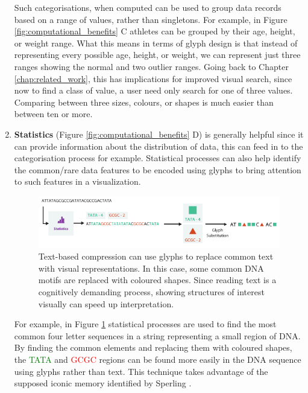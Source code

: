 \begin{enumerate}
Such categorisations, when computed can be used to group data records based on a range of values, rather than singletons.
For example, in Figure \ref{fig:computational_benefits} C athletes can be grouped by their age, height, or weight range.
What this means in terms of glyph design is that instead of representing every possible age, height, or weight, we can represent just three ranges showing the normal and two outlier ranges.
Going back to Chapter \ref{chap:related_work}, this has implications for improved visual search, since now to find a class of value, a user need only search for one of three values.
Comparing between three sizes, colours, or shapes is much easier than between ten or more.

\item \textbf{Statistics} (Figure \ref{fig:computational_benefits} D) is generally helpful since it can provide information about the distribution of data, this can feed in to the categorisation process for example.
Statistical processes can also help identify the common/rare data features to be encoded using glyphs to bring attention to such features in a visualization.

\begin{figure}[t!]
\centering
\includegraphics[width=\textwidth]{images/ch3/statistics_compression}
\caption{Text-based compression can use glyphs to replace common text with visual representations.
In this case, some common DNA motifs are replaced with coloured shapes.
Since reading text is a cognitively demanding process, showing structures of interest visually can speed up interpretation.
}
\label{fig:text_compress_glyph}
\end{figure}

For example, in Figure \ref{fig:text_compress_glyph} statistical processes are used to find the most common four letter sequences in a string representing a small region of DNA.
By finding the common elements and replacing them with coloured shapes, the \textcolor{Green}{TATA} and \textcolor{red}{GCGC} regions can be found more easily in the DNA sequence using glyphs rather than text.
This technique takes advantage of the supposed iconic memory identified by Sperling \cite{sperling60}.


\end{enumerate}
